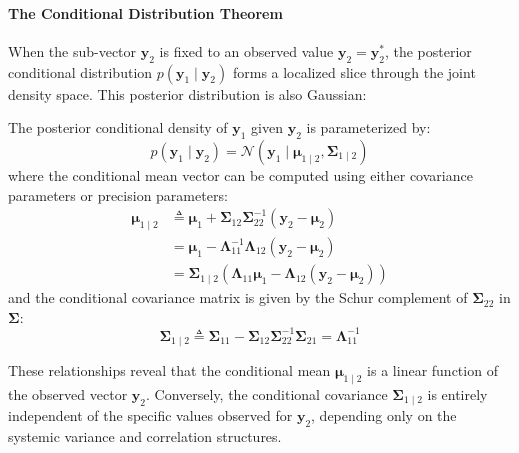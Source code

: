 \documentclass{article}
\begin{document}
\paragraph{The Conditional Distribution Theorem}
When the sub-vector $\mathbf{y}_2$ is fixed to an observed value $\mathbf{y}_2 = \mathbf{y}_2^*$, the posterior conditional distribution $p(\mathbf{y}_1 \mid \mathbf{y}_2)$ forms a localized slice through the joint density space. This posterior distribution is also Gaussian:
\begin{tcolorbox}[colback=blue!5!white, colframe=blue!60!black, title=The MVN Conditioning Equations]
The posterior conditional density of $\mathbf{y}_1$ given $\mathbf{y}_2$ is parameterized by:
\begin{equation}
p(\mathbf{y}_1 \mid \mathbf{y}_2) = \mathcal{N}(\mathbf{y}_1 \mid \boldsymbol{\mu}_{1\mid2}, \boldsymbol{\Sigma}_{1\mid2}) \tag{19}
\end{equation}
where the conditional mean vector can be computed using either covariance parameters or precision parameters:
\begin{align*}
\boldsymbol{\mu}_{1\mid2} &\triangleq \boldsymbol{\mu}_1 + \boldsymbol{\Sigma}_{12}\boldsymbol{\Sigma}_{22}^{-1}(\mathbf{y}_2 - \boldsymbol{\mu}_2) \tag{20a} \\
&= \boldsymbol{\mu}_1 - \boldsymbol{\Lambda}_{11}^{-1}\boldsymbol{\Lambda}_{12}(\mathbf{y}_2 - \boldsymbol{\mu}_2) \tag{20b} \\
&= \boldsymbol{\Sigma}_{1\mid2} \left( \boldsymbol{\Lambda}_{11}\boldsymbol{\mu}_1 - \boldsymbol{\Lambda}_{12}(\mathbf{y}_2 - \boldsymbol{\mu}_2) \right) \tag{20c}
\end{align*}
and the conditional covariance matrix is given by the Schur complement of $\boldsymbol{\Sigma}_{22}$ in $\boldsymbol{\Sigma}$:
\begin{equation}
\boldsymbol{\Sigma}_{1\mid2} \triangleq \boldsymbol{\Sigma}_{11} - \boldsymbol{\Sigma}_{12}\boldsymbol{\Sigma}_{22}^{-1}\boldsymbol{\Sigma}_{21} = \boldsymbol{\Lambda}_{11}^{-1} \tag{21}
\end{equation}
\end{tcolorbox}

These relationships reveal that the conditional mean $\boldsymbol{\mu}_{1\mid2}$ is a linear function of the observed vector $\mathbf{y}_2$. Conversely, the conditional covariance $\boldsymbol{\Sigma}_{1\mid2}$ is entirely independent of the specific values observed for $\mathbf{y}_2$, depending only on the systemic variance and correlation structures.
\end{document}

